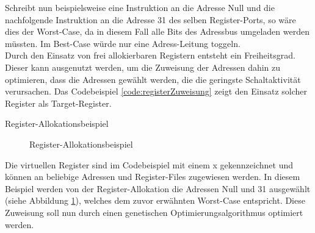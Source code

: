 Schreibt nun beispielsweise eine Instruktion an die Adresse Null und die nachfolgende Instruktion an die Adresse 31 des selben Register-Ports, so wäre dies der Worst-Case, da in diesem Fall alle Bits des Adressbus umgeladen werden müssten. Im Best-Case würde nur eine Adress-Leitung toggeln.\\
Durch den Einsatz von frei allokierbaren Registern entsteht ein Freiheitsgrad. Dieser kann ausgenutzt werden, um die Zuweisung der Adressen dahin zu optimieren, dass die Adressen gewählt werden, die die geringste Schaltaktivität verursachen. Das Codebeispiel \ref{code:registerZuweisung} zeigt den Einsatz solcher Register als Target-Register. 
\begin{algorithm}[H]
	\begin{algorithmic}[1]
		\caption{Register-Allokationsbeispiel}
		\label{code:registerZuweisung}
	\end{algorithmic}
\end{algorithm}

\begin{figure}[H] 
	\centering
	
	\caption{Register-Allokationsbeispiel}
	\label{fig:register_aloc_example}
\end{figure}
Die virtuellen Register sind im Codebeispiel mit einem x gekennzeichnet und können an beliebige Adressen und Register-Files zugewiesen werden. In diesem Beispiel werden von der Register-Allokation die Adressen Null und 31 ausgewählt (siehe Abbildung \ref{fig:register_aloc_example}), welches dem zuvor erwähnten Worst-Case entspricht. Diese Zuweisung soll nun durch einen genetischen Optimierungsalgorithmus optimiert werden.\\

